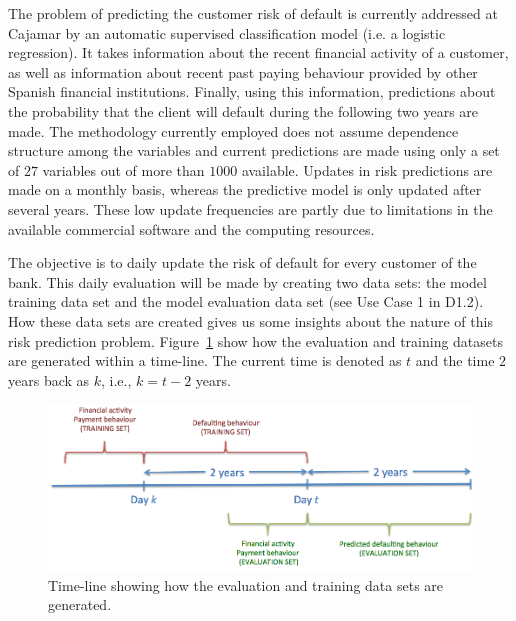 The problem of predicting the customer risk of default is currently addressed at Cajamar by an automatic supervised classification model (i.e. a logistic regression). It takes information about the recent financial activity of a customer, as well as information about recent past paying behaviour provided by other Spanish financial institutions. Finally, using this information, predictions about the probability that the client will default during the following two years are made. The methodology currently employed does not assume dependence structure among the variables and current predictions are made using only a set of $27$ variables out of more than $1000$ available. Updates in risk predictions are made on a monthly basis, whereas the predictive model is only updated after several years. These low update frequencies are partly due to limitations in the available commercial software and the computing resources.

The objective is to daily update the risk of default for every customer of the bank. This daily evaluation will be made by creating two data sets: the model training data set and the model evaluation data set (see Use Case 1 in D1.2). How these data sets are created gives us some insights about the nature of this risk prediction problem.  Figure~\ref{Figure:CajaMarTimeLine} show how the evaluation and training datasets are generated within a time-line. The current time is denoted as $t$ and the time $2$ years back as $k$, i.e., $k=t-2$ years. 

\begin{figure}[htbp]
\centering
\includegraphics[scale=0.4]{figures/CajaMarTimeLine}
\caption{\label{Figure:CajaMarTimeLine}Time-line showing how the evaluation and training data sets are generated.}
\end{figure}

